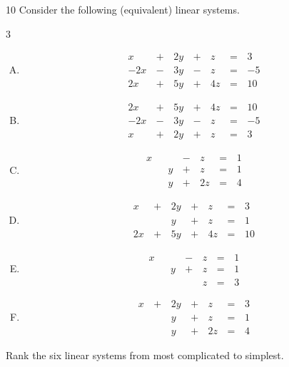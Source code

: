 \begin{activity}{10}
  Consider the following (equivalent) linear systems.
  \begin{multicols}{3}%
  \begin{enumerate}[(A)]
    \item 
	\[
		\begin{alignedat}{4}
   		  x &\,+\,& 2y  &\,+\,& z &\,=\,& 3 \\  
   		  -2x &\,-\,& 3y  &\,-\,& z &\,=\,& -5 \\  
   		  2x &\,+\,& 5y  &\,+\,& 4z &\,=\,& 10   
   		\end{alignedat}
	\]

    \item 
	\[
		\begin{alignedat}{4}
   		  2x &\,+\,& 5y  &\,+\,& 4z &\,=\,& 10 \\  
   		  -2x &\,-\,& 3y  &\,-\,& z &\,=\,& -5 \\  
   		  x &\,+\,& 2y  &\,+\,& z &\,=\,& 3  
   		\end{alignedat}
	\]

    \item \[
		\begin{alignedat}{4}
   		  x & &   &\,-\,& z &\,=\,& 1 \\  
   		   & & y  &\,+\,& z &\,=\,& 1 \\  
   		   & & y  &\,+\,& 2z &\,=\,& 4   
   		\end{alignedat}
	\]

    \item \[
		\begin{alignedat}{4}
   		  x &\,+\,& 2y  &\,+\,& z &\,=\,& 3 \\  
   		   & & y  &\,+\,& z &\,=\,& 1 \\  
   		  2x &\,+\,& 5y  &\,+\,& 4z &\,=\,& 10   
   		\end{alignedat}
	\]

    \item \[
		\begin{alignedat}{4}
   		  x & &   &\,-\,& z &\,=\,& 1 \\  
   		   & & y  &\,+\,& z &\,=\,& 1 \\  
   		   & &   & & z &\,=\,& 3   
   		\end{alignedat}
	\]

    \item \[
		\begin{alignedat}{4}
   		  x &\,+\,& 2y  &\,+\,& z &\,=\,& 3 \\  
   		   & & y  &\,+\,& z &\,=\,& 1 \\  
   		   & & y  &\,+\,& 2z &\,=\,& 4   
   		\end{alignedat}
	\]
	\end{enumerate}
    \end{multicols}
   Rank the six linear systems from most complicated to simplest.
\end{activity}


